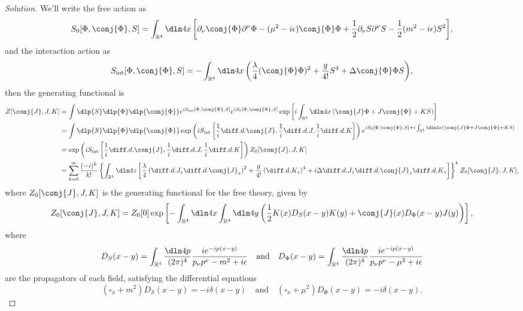 \begin{proof}[Solution]
   We'll write the free action as
   \begin{equation*}
      S_0[\Phi, \conj{\Phi}, S] = \int_{\mathbb{R}^4}{\dln4x \left[\partial_\nu \conj{\Phi} \partial^\nu \Phi - (\mu^2 - i \epsilon) \conj{\Phi}\Phi + \frac12 \partial_\nu S\partial^\nu S - \frac12 (m^2 - i \epsilon) S^2\right]},
   \end{equation*}
   and the interaction action as
   \begin{equation*}
      S_\mathrm{int}[\Phi, \conj{\Phi}, S] = -\int_{\mathbb{R}^4}{\dln4x\left(\frac{\lambda}{4} (\conj{\Phi}\Phi)^2  + \frac{g}{4!} S^4 + \Delta \conj{\Phi}\Phi S\right)},
   \end{equation*}
   then the generating functional is
   \begin{align*}
      Z[\conj{J}, J, K] &= \int{\dlp{S} \dlp{\Phi}\dlp{\conj{\Phi}} e^{iS_\mathrm{int}[\Phi, \conj{\Phi}, S]} e^{i S_0[\Phi, \conj{\Phi}, S]} \exp\left[i\int_{\mathbb{R}^4}{\dln4x \left(\conj{J}\Phi + J \conj{\Phi} + K S\right)}\right]}\\
                        &= \int{\dlp{S} \dlp{\Phi}\dlp{\conj{\Phi}} \exp\left(iS_\mathrm{int}\left[\frac{1}{i} \diff.d.{}{\conj{J}}, \frac1i \diff.d.{}{J}, \frac1i \diff.d.{}{K}\right]\right) e^{i S_0[\Phi, \conj{\Phi}, S] + i\int_{\mathbb{R}^4}{\dln4x \left(\conj{J}\Phi + J \conj{\Phi} + K S\right)}}}\\
                        &= \exp\left(iS_\mathrm{int}\left[\frac{1}{i} \diff.d.{}{\conj{J}}, \frac1i \diff.d.{}{J}, \frac1i \diff.d.{}{K}\right]\right) Z_0[\conj{J}, J, K]\\
                        &= \sum_{k = 0}^\infty{\frac{(-i)^k}{k!} \left\{\int_{\mathbb{R}^4}{\dln4z\left[\frac{\lambda}{4} \left(\diff.d.{}{J_z} \diff.d.{}{\conj{J}_z}\right)^2  + \frac{g}{4!} \left(\diff.d.{}{K_z}\right)^4 + i\Delta \diff.d.{}{J_z}\diff.d.{}{\conj{J}_z} \diff.d.{}{K_z}\right]}\right\}^kZ_0[\conj{J}, J, K]},
   \end{align*}
   where \(Z_0[\conj{J},J,K]\) is the generating functional for the free theory, given by
   \begin{equation*}
      Z_0[\conj{J},J,K] = Z_0[0] \exp\left[-\int_{\mathbb{R}^4}{
            \dln4{x}\int_{\mathbb{R}^4}{
               \dln4{y} \left(\frac12 K(x)D_S(x-y)K(y) + \conj{J}(x) D_\Phi(x - y) J(y)\right)
            }
      }\right],
   \end{equation*}
   where
   \begin{equation*}
      D_S(x-y) = \int_{\mathbb{R}^4}\frac{\dln4p}{(2\pi)^4} \frac{ie^{-ip(x-y)}}{p_\nu p^\nu - m^2 + i \epsilon}
      \quad\text{and}\quad
      D_\Phi(x-y) = \int_{\mathbb{R}^4}\frac{\dln4p}{(2\pi)^4} \frac{ie^{-ip(x-y)}}{p_\nu p^\nu - \mu^2 + i \epsilon}
   \end{equation*}
   are the propagators of each field, satisfying the differential equations
   \begin{equation*}
      (\square_x + m^2) D_S(x-y) = -i \delta(x - y)
      \quad\text{and}\quad
      (\square_x + \mu^2) D_\Phi(x - y) = -i \delta(x-y).
   \end{equation*}


\end{proof}
